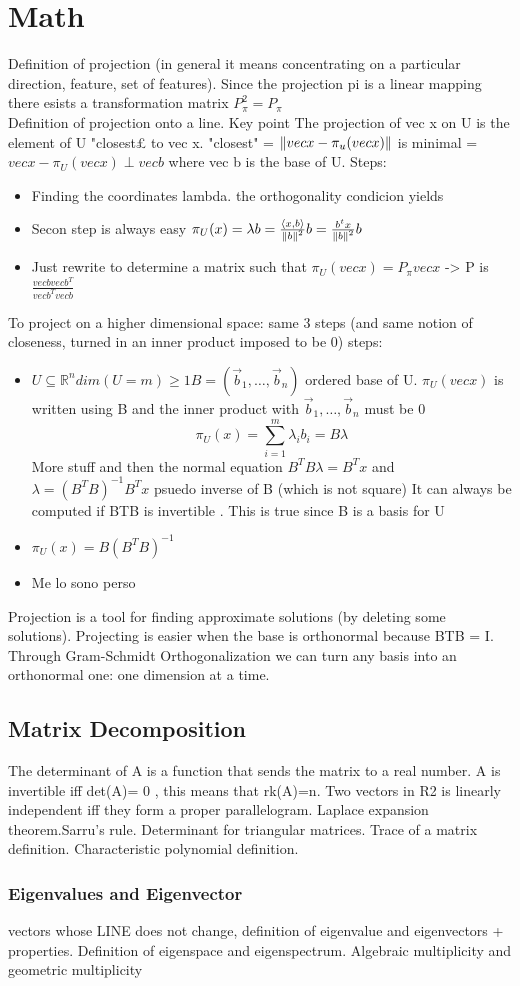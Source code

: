 \section{Math}
Definition of projection (in general it means concentrating on a particular direction, feature, set of features). Since the projection pi is a linear mapping there esists a transformation matrix $ P_\pi^2 = P_\pi $\\ Definition of projection onto a line. Key point The projection of vec x on U is the element of U "closest£ to vec x. "closest" = $ \left\lVert vec x - \pi_u(vec x)\right\rVert $ is minimal = $ vec x - \pi_U(vec x) \perp vec b $ where vec b is the base of U. Steps: 
\begin{itemize}
    \item Finding the coordinates lambda. the orthogonality condicion yields
    \item Secon step is always easy $ \pi_U(x) = \lambda b = \frac{\left\langle x,b\right\rangle}{\left\lVert b\right\rVert^2}b = \frac{b^tx}{\left\lVert b\right\rVert^2}b $ 
    \item Just rewrite to determine a matrix such that $ \pi_U(vec x) = P_\pi vec x $ -> P is $ \frac{vec b vec b^T}{vec b^T vec b} $ 
\end{itemize}  
To project on a higher dimensional space: same 3 steps (and same notion of closeness, turned in an inner product imposed to be 0)
steps:
\begin{itemize}
    \item $U \subseteq \mathbb{R}^n dim(U = m)\geq 1 B= (\vec{b}_{1}, \ldots,\vec{b}_{n})$ ordered base of U. $\pi_U(vec x)$ is written using B and the inner product with $\vec{b}_{1}, \ldots,\vec{b}_{n}$ must be 0
    \[ 
        \pi_U (x) = \sum_{i=1}^{m}{\lambda_ib_i = B\lambda}
    \]More stuff and then the normal equation $B^TB\lambda = B^Tx$ and $\lambda = (B^TB)^{-1}B^Tx$ psuedo inverse of B (which is not square) It can always be computed if BTB is invertible . This is true since B is a basis for U
    \item $ \pi_U(x) = B(B^TB)^{-1} $ 
    \item Me lo sono perso
\end{itemize}
Projection is a tool for finding approximate solutions (by deleting some solutions). Projecting is easier when the base is orthonormal because BTB = I. Through Gram-Schmidt Orthogonalization we can turn any basis into an orthonormal one: one dimension at a time.
\subsection{Matrix Decomposition}
The determinant of A is a function that sends the matrix to a real number. A is invertible iff det(A)= 0 , this means that rk(A)=n. Two vectors in R2 is linearly independent iff they form a proper parallelogram. Laplace expansion theorem.Sarru's rule. Determinant for triangular matrices. Trace of a matrix definition. Characteristic polynomial definition.
\subsubsection{Eigenvalues and Eigenvector}
vectors whose LINE does not change, definition of eigenvalue and eigenvectors + properties. Definition of eigenspace and eigenspectrum. Algebraic multiplicity and geometric multiplicity